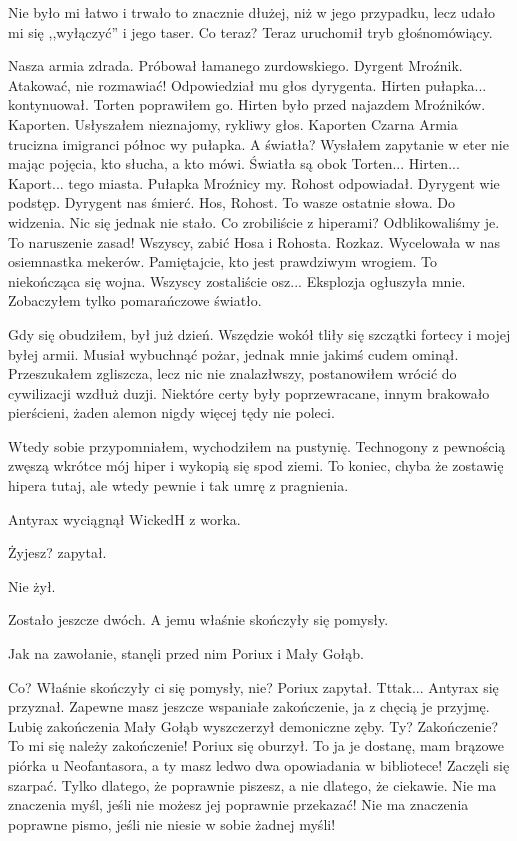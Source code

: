 Nie było mi łatwo i trwało to znacznie dłużej, niż w jego przypadku, lecz udało mi się ,,wyłączyć'' i jego taser.
Co teraz?
Teraz uruchomił tryb głośnomówiący.
\begin{dialogue}
\ds{} Nasza armia zdrada. \dm{} Próbował łamanego zurdowskiego. \dm{} Dyrgent Mroźnik.
\ds{} Atakować, nie rozmawiać! \dm{} Odpowiedział mu głos dyrygenta.
\ds{} Hirten pułapka... \dm{} kontynuował.
\ds{} Torten \dm{} poprawiłem go. \dm{} Hirten było przed najazdem Mroźników.
\ds{} Kaporten. \dm{} Usłyszałem nieznajomy, rykliwy głos. \dm{} Kaporten Czarna Armia trucizna imigranci północ wy pułapka.
\ds{} A światła? \dm{} Wysłałem zapytanie w eter nie mając pojęcia, kto słucha, a kto mówi. \dm{} Światła są obok Torten... Hirten... Kaport... tego miasta.
\ds{} Pułapka Mroźnicy my. \dm{} Rohost odpowiadał. \dm{} Dyrygent wie podstęp. Dyrygent nas śmierć.
\ds{} Hos, Rohost. To wasze ostatnie słowa. Do widzenia. \dm{} Nic się jednak nie stało. \dm{} Co zrobiliście z hiperami?
\ds{} Odblikowaliśmy je. 
\ds{} To naruszenie zasad! Wszyscy, zabić Hosa i Rohosta. Rozkaz. \dm{} Wycelowała w nas osiemnastka mekerów.
\ds{} Pamiętajcie, kto jest prawdziwym wrogiem. To niekończąca się wojna. Wszyscy zostaliście osz... \dm{} Eksplozja ogłuszyła mnie. Zobaczyłem tylko pomarańczowe światło.
\end{dialogue}

Gdy się obudziłem, był już dzień. Wszędzie wokół tliły się szczątki fortecy i mojej byłej armii.
Musiał wybuchnąć pożar, jednak mnie jakimś cudem ominął.
Przeszukałem zgliszcza, lecz nic nie znalazłwszy, postanowiłem wrócić do cywilizacji wzdłuż duzji. 
Niektóre certy były poprzewracane, innym brakowało pierścieni, żaden alemon nigdy więcej tędy nie poleci.

Wtedy sobie przypomniałem, wychodziłem na pustynię. Technogony z pewnością zwęszą wkrótce mój hiper i wykopią się spod ziemi.
To koniec, chyba że zostawię hipera tutaj, ale wtedy pewnie i tak umrę z pragnienia.

\divider{}

Antyrax wyciągnął WickedH z worka.
\begin{dialogue}
\ds{} Żyjesz? \dm{} zapytał. 
\end{dialogue}
Nie żył.

Zostało jeszcze dwóch.
A jemu właśnie skończyły się pomysły.

Jak na zawołanie, stanęli przed nim Poriux i Mały Gołąb.
\begin{dialogue}
\ds{} Co? Właśnie skończyły ci się pomysły, nie? \dm{} Poriux zapytał.
\ds{} Tttak... \dm{} Antyrax się przyznał.
\ds{} Zapewne masz jeszcze wspaniałe zakończenie, ja z chęcią je przyjmę. Lubię zakończenia \dm{} Mały Gołąb wyszczerzył demoniczne zęby.
\ds{} Ty? Zakończenie? To mi się należy zakończenie! \dm{} Poriux się oburzył.
\ds{} To ja je dostanę, mam brązowe piórka u Neofantasora, a ty masz ledwo dwa opowiadania w bibliotece! \dm{} Zaczęli się szarpać.
\ds{} Tylko dlatego, że poprawnie piszesz, a nie dlatego, że ciekawie.
\ds{} Nie ma znaczenia myśl, jeśli nie możesz jej poprawnie przekazać!
\ds{} Nie ma znaczenia poprawne pismo, jeśli nie niesie w sobie żadnej myśli!
\end{dialogue}

